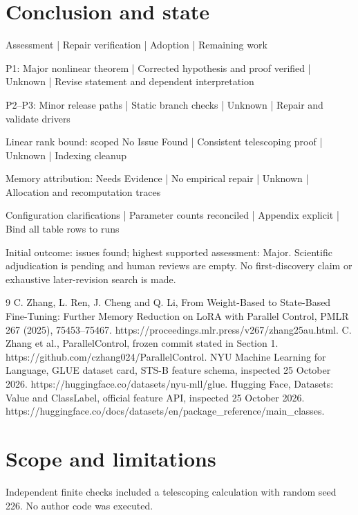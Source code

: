 \documentclass[10pt]{article}
\begin{document}
\section*{Conclusion and state}
Assessment | Repair verification | Adoption | Remaining work\par
P1: Major nonlinear theorem | Corrected hypothesis and proof verified | Unknown | Revise statement and dependent interpretation\par
P2–P3: Minor release paths | Static branch checks | Unknown | Repair and validate drivers\par
Linear rank bound: scoped No Issue Found | Consistent telescoping proof | Unknown | Indexing cleanup\par
Memory attribution: Needs Evidence | No empirical repair | Unknown | Allocation and recomputation traces\par
Configuration clarifications | Parameter counts reconciled | Appendix explicit | Bind all table rows to runs\par
Initial outcome: issues found; highest supported assessment: Major. Scientific adjudication is pending and human reviews are empty. No first-discovery claim or exhaustive later-revision search is made.\par
9 C. Zhang, L. Ren, J. Cheng and Q. Li, From Weight-Based to State-Based Fine-Tuning: Further Memory Reduction on LoRA with Parallel Control, PMLR 267 (2025), 75453–75467. https://proceedings.mlr.press/v267/zhang25au.html. C. Zhang et al., ParallelControl, frozen commit stated in Section 1. https://github.com/czhang024/ParallelControl. NYU Machine Learning for Language, GLUE dataset card, STS-B feature schema, inspected 25 October 2026. https://huggingface.co/datasets/nyu-mll/glue. Hugging Face, Datasets: Value and ClassLabel, official feature API, inspected 25 October 2026. https://huggingface.co/docs/datasets/en/package\_reference/main\_classes.\par
\section*{Scope and limitations}
Independent finite checks included a telescoping calculation with random seed 226. No author code was executed.\par
\end{document}
